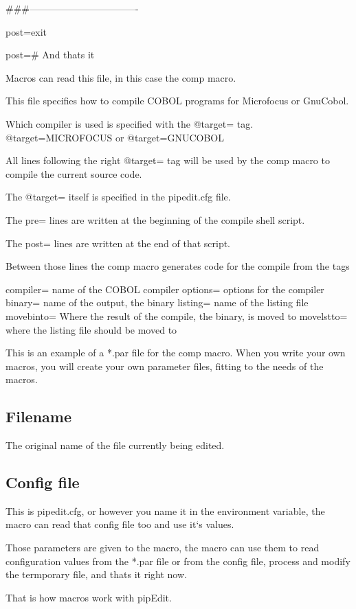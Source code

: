 \documentclass{report}
\begin{document}
\#\#\#----------------------------------

post=exit

post=\# And thats it


Macros can read this file, in this case the comp macro.

This file specifies how to compile COBOL programs for Microfocus or GnuCobol.

Which compiler is used is specified with the @target= tag.
@target=MICROFOCUS 		or
@target=GNUCOBOL

All lines following the right @target= tag will be used by the comp macro to compile the current source code.

The @target= itself is specified in the pipedit.cfg file.

The pre= lines are written at the beginning of the compile shell script.

The post= lines are written at the end of that script.

Between those lines the comp macro generates code for the compile from the tags

compiler=
name of the COBOL compiler
options=
options for the compiler
binary=
name of the output, the binary
listing=
name of the listing file
movebinto=
Where the result of the compile, the binary, is moved to
movelstto=
where the listing file should be moved to


This is an example of a *.par file for the comp macro.
When you write your own macros, you will create your own parameter files, fitting to the needs of the macros.

\subsection{Filename}
The original name of the file currently being edited.

\subsection{Config file}
This is pipedit.cfg, or however you name it in the environment variable, the macro can read that config file too and use it‘s values.


Those parameters are given to the macro, the macro can use them to read configuration values from the *.par file or from the config file, process and modify the termporary file, and thats it right now.

That is how macros work with pipEdit.
\end{document}
